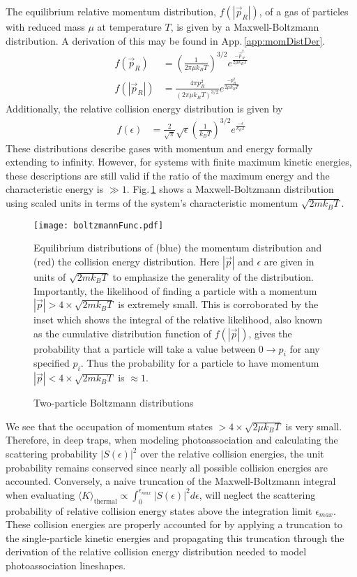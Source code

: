 The equilibrium relative momentum distribution, $f(|\vec{p}_R|)$, of a gas of particles with reduced mass $\mu$ at temperature $T$, is given by a Maxwell-Boltzmann distribution.
A derivation of this may be found in App.\,\ref{app:momDistDer}.
\begin{align*}
	 f( \vec{p}_R ) &= \left( \frac{1}{2 \pi \mu k_B T} \right)^{3/2} e^{\frac{-\vec{p}_R^2}{2 \mu k_B T}} \\
	 f( |\vec{p}_R| ) &= \frac{4 \pi p_R^2}{\left( 2 \pi \mu k_B T \right)^{3/2}}e^{\frac{-p_R^2}{2 \mu k_B T}}
\end{align*}
Additionally, the relative collision energy distribution is given by
\begin{align*}
	 f( \epsilon ) &= \frac{2}{\sqrt{\pi}} \sqrt{\epsilon} \left( \frac{1}{ k_B T} \right)^{3/2} e^{\frac{-\epsilon}{k_B T}}
\end{align*}
These distributions describe gases with momentum and energy formally extending to infinity.
However, for systems with finite maximum kinetic energies, these descriptions are still valid if the ratio of the maximum energy and the characteristic energy is $\gg 1$.
Fig.\,\ref{fig:singleBoltz} shows a Maxwell-Boltzmann distribution using scaled units in terms of the system's characteristic momentum $\sqrt{2 m k_B T}$.
	\begin{figure} 
		\centerline{
		\texttt{[image: boltzmannFunc.pdf]}}
		\caption{Two-particle Boltzmann distributions}{Equilibrium distributions of (blue) the momentum distribution and (red) the collision energy distribution. Here $|\vec{p}|$ and $\epsilon$ are given in units of $\sqrt{2 m k_B T}$ to emphasize the generality of the distribution. Importantly, the likelihood of finding a particle with a momentum $|\vec{p}| > 4 \times \sqrt{2 m k_B T}$ is extremely small. This is corroborated by the inset which shows the integral of the relative likelihood, also known as the cumulative distribution function of $f(|\vec{p}|)$, gives the probability that a particle will take a value between $0 \rightarrow p_i$ for any specified $p_i$. Thus the probability for a particle to have momentum $|\vec{p}| < 4 \times \sqrt{2 m k_B T}$ is $\approx 1$.}
		\label{fig:singleBoltz}
	\end{figure}
We see that the occupation of momentum states $> 4 \times \sqrt{2 \mu k_B T}$ is very small.
Therefore, in deep traps, when modeling photoassociation and calculating the scattering probability $\vert S(\epsilon) \vert^2$ over the relative collision energies, the unit probability remains conserved since nearly all possible collision energies are accounted.
Conversely, a naive truncation of the Maxwell-Boltzmann integral when evaluating $\langle K \rangle_\text{thermal} \propto \displaystyle \int_0^{\epsilon_{max}} \vert S(\epsilon) \vert^2 d\epsilon$, will neglect the scattering probability of relative collision energy states above the integration limit $\epsilon_{max}$.
These collision energies are properly accounted for by applying a truncation to the single-particle kinetic energies and propagating this truncation through the derivation of the relative collision energy distribution needed to model photoassociation lineshapes.

